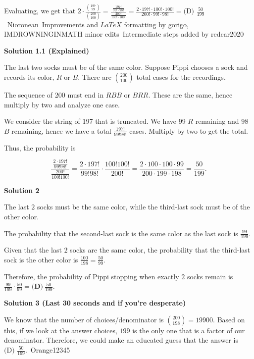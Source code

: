 \begin{enumerate}
 Evaluating, we get that $2\cdot\frac{\binom{197}{99}}{\binom{200}{100}}=\frac{\frac{197!}{99!\cdot98!}}{\frac{200!}{100!\cdot100!}}=\frac{2\cdot 197! \cdot 100! \cdot 100!}{200! \cdot 99! \cdot 98!}=\boxed{\text{(D) }\frac{50}{199}}$~Nioronean~Improvements and $LaTeX$ formatting by gorigo, IMDROWNINGINMATH minor edits~Intermediate steps added by redcar2020

 



\textbf{Solution 1.1 (Explained)}

The last two socks must be of the same color. Suppose Pippi chooses a sock and records its color, $R$ or $B$. There are $\binom{200}{100}$ total cases for the recordings.

 The sequence of 200 must end in $RBB$ or $BRR$. These are the same, hence multiply by two and analyze one case.

 We consider the string of 197 that is truncated. We have 99 $R$ remaining and 98 $B$ remaining, hence we have a total $\frac{197!}{99!98!}$ cases. Multiply by two to get the total.

 Thus, the probability is 

 
 \[\frac{\frac{2 \cdot 197!}{99!98!}}{\frac{200!}{100!100!}} = \frac{2 \cdot 197!}{99!98!} \cdot \frac{100!100!}{200!} = \frac{2 \cdot 100 \cdot 100 \cdot 99}{200 \cdot 199 \cdot 198} = \boxed{\frac{50}{199}}.\]




\textbf{Solution 2}

The last $2$ socks must be the same color, while the third-last sock must be of the other color.  

 The probability that the second-last sock is the same color as the last sock is $\frac{99}{199}$.

 Given that the last $2$ socks are the same color, the probability that the third-last sock is the other color is $\frac{100}{198} = \frac{50}{99}$.

 Therefore, the probability of Pippi stopping when exactly $2$ socks remain is $\frac{99}{199}\cdot\frac{50}{99}= \boxed{\textbf{(D)}\ \frac{50}{199}}$.

 



\textbf{Solution 3 (Last 30 seconds and if you’re desperate)}

We know that the number of choices/denominator is ${200 \choose 198} = 19900$. Based on this, if we look at the answer choices, $199$ is the only one that is a factor of our denominator. Therefore, we could make an educated guess that the answer is $\boxed{\text{(D) }\frac{50}{199}}$.~Orange12345


\end{enumerate}
